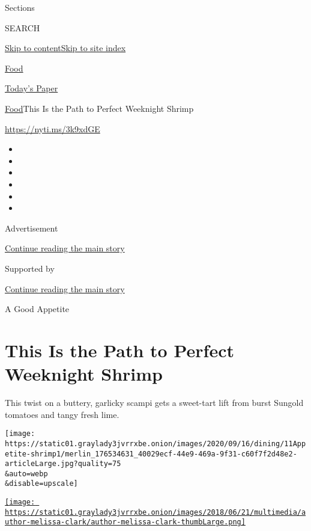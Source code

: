 Sections

SEARCH

\protect\hyperlink{site-content}{Skip to
content}\protect\hyperlink{site-index}{Skip to site index}

\href{https://www.nytimes3xbfgragh.onion/section/food}{Food}

\href{https://myaccount.nytimes3xbfgragh.onion/auth/login?response_type=cookie\&client_id=vi}{}

\href{https://www.nytimes3xbfgragh.onion/section/todayspaper}{Today's
Paper}

\href{/section/food}{Food}\textbar{}This Is the Path to Perfect
Weeknight Shrimp

\url{https://nyti.ms/3k9xdGE}

\begin{itemize}
\item
\item
\item
\item
\item
\item
\end{itemize}

Advertisement

\protect\hyperlink{after-top}{Continue reading the main story}

Supported by

\protect\hyperlink{after-sponsor}{Continue reading the main story}

A Good Appetite

\hypertarget{this-is-the-path-to-perfect-weeknight-shrimp}{%
\section{This Is the Path to Perfect Weeknight
Shrimp}\label{this-is-the-path-to-perfect-weeknight-shrimp}}

This twist on a buttery, garlicky scampi gets a sweet-tart lift from
burst Sungold tomatoes and tangy fresh lime.

\texttt{[image: https://static01.graylady3jvrrxbe.onion/images/2020/09/16/dining/11Appetite-shrimp1/merlin\_176534631\_40029ecf-44e9-469a-9f31-c60f7f2d48e2-articleLarge.jpg?quality=75\\\&auto=webp\\\&disable=upscale]}

\href{https://www.nytimes3xbfgragh.onion/by/melissa-clark}{\texttt{[image: https://static01.graylady3jvrrxbe.onion/images/2018/06/21/multimedia/author-melissa-clark/author-melissa-clark-thumbLarge.png]}}

